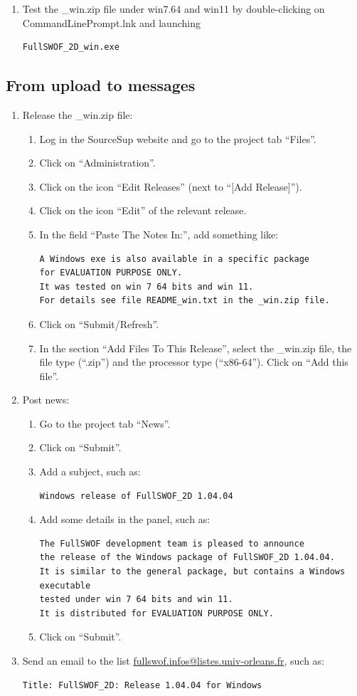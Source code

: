 \documentclass[a4paper, 11pt]{article}
\begin{document}
\begin{enumerate}
\item Test the \_win.zip file under win7.64 and win11 by
double-clicking on CommandLinePrompt.lnk and launching
\begin{verbatim}
FullSWOF_2D_win.exe
\end{verbatim}
\end{enumerate}

\subsection{From upload to messages}
\begin{enumerate}
\item Release the \_win.zip file:
\begin{enumerate}
\item Log in the SourceSup website and go to the project tab ``Files''.
\item Click on ``Administration''.
\item Click on the icon ``Edit Releases'' (next to ``[Add Release]'').
\item Click on the icon ``Edit'' of the relevant release.
\item In the field ``Paste The Notes In:'', add something like:
\begin{verbatim}
A Windows exe is also available in a specific package 
for EVALUATION PURPOSE ONLY.
It was tested on win 7 64 bits and win 11.
For details see file README_win.txt in the _win.zip file.
\end{verbatim}
\item Click on ``Submit/Refresh''.
\item In the section ``Add Files To This Release'', select the \_win.zip file,
the file type (``.zip'') and the processor type  (``x86-64''). Click on ``Add this file''.
\end{enumerate}
\item Post news:
\begin{enumerate}
\item Go to the project tab ``News''.
\item Click on ``Submit''.
\item Add a subject, such as:
\begin{verbatim}
Windows release of FullSWOF_2D 1.04.04
\end{verbatim}
\item Add some details in the panel, such as:
\begin{verbatim}
The FullSWOF development team is pleased to announce
the release of the Windows package of FullSWOF_2D 1.04.04.
It is similar to the general package, but contains a Windows executable 
tested under win 7 64 bits and win 11.
It is distributed for EVALUATION PURPOSE ONLY.
\end{verbatim}
\item Click on ``Submit''.
\end{enumerate}
\item Send an email to the list
\href{mailto:fullswof.infos@listes.univ-orleans.fr}{fullswof.infos@listes.univ-orleans.fr}, such as:
\begin{verbatim}
Title: FullSWOF_2D: Release 1.04.04 for Windows


\end{verbatim}
\end{enumerate}
\end{document}

